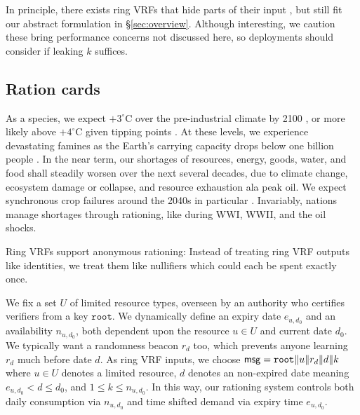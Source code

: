 
In principle, there exists ring VRFs that hide parts of their input
\msg, but still fit our abstract formulation in \S\ref{sec:overview}.
Although interesting, we caution these bring performance concerns not
discussed here, so deployments should consider if leaking $k$ suffices.


\subsection{Ration cards}

As a species, we expect $+3^{\circ}$C over the pre-industrial climate
by 2100 \cite{IPCC2022}, or more likely above $+4^{\circ}$C given
tipping points \cite{tipping2022}.  %
At these levels, we experience devastating famines as the Earth's
carrying capacity drops below one billion people \cite{carrying_capacity}.
In the near term, our shortages of resources, energy, goods, water,
and food shall steadily worsen over the next several decades, due to
climate change, ecosystem damage or collapse, and resource exhaustion
ala peak oil.  We expect synchronous crop failures around the 2040s
in particular \cite{climaterisk2021}. %
Invariably, nations manage shortages through rationing, like during WWI, WWII, and the oil shocks.  

Ring VRFs support anonymous rationing:
Instead of treating ring VRF outputs like identities,
we treat them like nullifiers which could each be spent exactly once.

\def\expiry{e}
We fix a set $U$ of limited resource types, overseen by
 an authority who certifies verifiers from a key $\mathtt{root}$.
We dynamically define an expiry date $\expiry_{u,d_0}$ and an availability $n_{u,d_0}$,
both dependent upon the resource $u \in U$ and current date $d_0$.
We typically want a randomness beacon $r_d$ too, which prevents
anyone learning $r_d$ much before date $d$. 
As ring VRF inputs, we choose
 $\mathsf{msg} = \mathtt{root} \| u \| r_d \| d \| k$
where $u \in U$ denotes a limited resource,
 $d$ denotes an non-expired date meaning $\expiry_{u,d_0} < d \le d_0$,
 and $1 \le k \le n_{u,d_0}$.
In this way, our rationing system controls both daily consumption
via $n_{u,d_0}$ and time shifted demand via expiry time $\expiry_{u,d_0}$.

